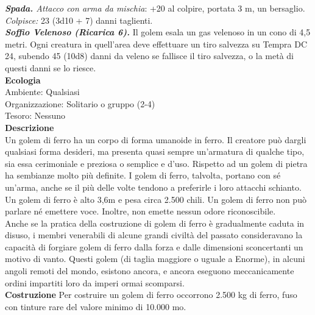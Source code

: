 \begin{multicols}{2}
\emph{\textbf{Spada.} Attacco con arma da mischia}: +20 al colpire, portata 3 m, un bersaglio.\\
\emph{Colpisce:} 23 (3d10 + 7) danni taglienti.\\
\emph{\textbf{Soffio Velenoso (Ricarica 6).}} Il golem esala un gas velenoso in un cono di 4,5 metri. Ogni creatura in quell'area deve effettuare un tiro salvezza su Tempra DC  24, subendo 45 (10d8) danni da veleno se fallisce il tiro salvezza, o la metà di questi danni se lo riesce.\\
\textbf{Ecologia}\\
Ambiente: Qualsiasi\\
Organizzazione: Solitario o gruppo (2-4)\\
Tesoro: Nessuno\\
\textbf{Descrizione}\\
Un golem di ferro ha un corpo di forma umanoide in ferro. Il creatore può dargli qualsiasi forma desideri, ma presenta quasi sempre un'armatura di qualche tipo, sia essa cerimoniale e preziosa o semplice e d'uso. Rispetto ad un golem di pietra ha sembianze molto più definite. I golem di ferro, talvolta, portano con sé un'arma, anche se il più delle volte tendono a preferirle i loro attacchi schianto.\\

Un golem di ferro è alto 3,6m e pesa circa 2.500 chili. Un golem di ferro non può parlare né emettere voce. Inoltre, non emette nessun odore riconoscibile.\\

Anche se la pratica della costruzione di golem di ferro è gradualmente caduta in disuso, i membri venerabili di alcune grandi civiltà del passato consideravano la capacità di forgiare golem di ferro dalla forza e dalle dimensioni sconcertanti un motivo di vanto. Questi golem (di taglia maggiore o uguale a Enorme), in alcuni angoli remoti del mondo, esistono ancora, e ancora eseguono meccanicamente ordini impartiti loro da imperi ormai scomparsi.\\

\textbf{Costruzione}
Per costruire un golem di ferro occorrono 2.500 kg di ferro, fuso con tinture rare del valore minimo di 10.000 mo.\\


\end{multicols}

